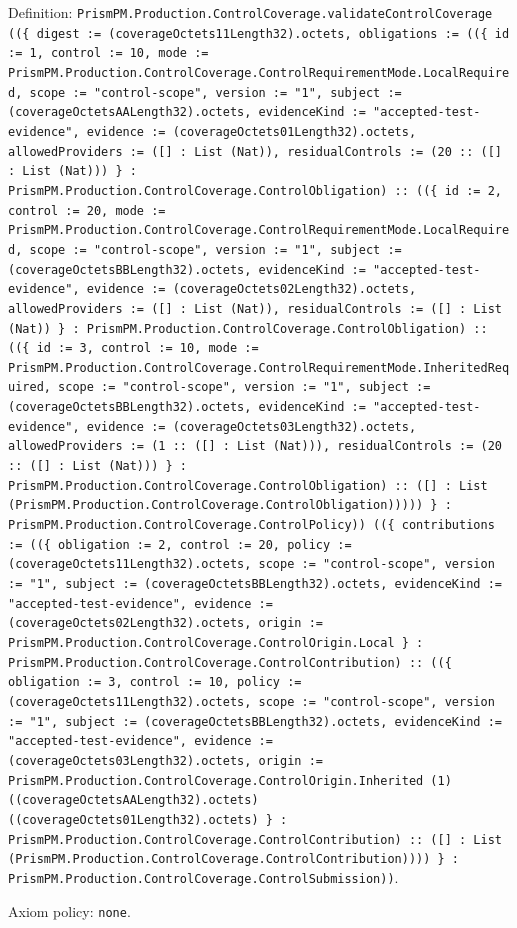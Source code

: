 \documentclass[11pt]{article}
\begin{document}
\noindent Definition: \texttt{PrismPM.Production.ControlCoverage.validateControlCoverage ((\{ digest := (coverageOctets11Length32).octets, obligations := ((\{ id := 1, control := 10, mode := PrismPM.Production.ControlCoverage.ControlRequirementMode.LocalRequired, scope := "control-scope", version := "1", subject := (coverageOctetsAALength32).octets, evidenceKind := "accepted-test-evidence", evidence := (coverageOctets01Length32).octets, allowedProviders := ([] : List (Nat)), residualControls := (20 :: ([] : List (Nat))) \} : PrismPM.Production.ControlCoverage.ControlObligation) :: ((\{ id := 2, control := 20, mode := PrismPM.Production.ControlCoverage.ControlRequirementMode.LocalRequired, scope := "control-scope", version := "1", subject := (coverageOctetsBBLength32).octets, evidenceKind := "accepted-test-evidence", evidence := (coverageOctets02Length32).octets, allowedProviders := ([] : List (Nat)), residualControls := ([] : List (Nat)) \} : PrismPM.Production.ControlCoverage.ControlObligation) :: ((\{ id := 3, control := 10, mode := PrismPM.Production.ControlCoverage.ControlRequirementMode.InheritedRequired, scope := "control-scope", version := "1", subject := (coverageOctetsBBLength32).octets, evidenceKind := "accepted-test-evidence", evidence := (coverageOctets03Length32).octets, allowedProviders := (1 :: ([] : List (Nat))), residualControls := (20 :: ([] : List (Nat))) \} : PrismPM.Production.ControlCoverage.ControlObligation) :: ([] : List (PrismPM.Production.ControlCoverage.ControlObligation))))) \} : PrismPM.Production.ControlCoverage.ControlPolicy)) ((\{ contributions := ((\{ obligation := 2, control := 20, policy := (coverageOctets11Length32).octets, scope := "control-scope", version := "1", subject := (coverageOctetsBBLength32).octets, evidenceKind := "accepted-test-evidence", evidence := (coverageOctets02Length32).octets, origin := PrismPM.Production.ControlCoverage.ControlOrigin.Local \} : PrismPM.Production.ControlCoverage.ControlContribution) :: ((\{ obligation := 3, control := 10, policy := (coverageOctets11Length32).octets, scope := "control-scope", version := "1", subject := (coverageOctetsBBLength32).octets, evidenceKind := "accepted-test-evidence", evidence := (coverageOctets03Length32).octets, origin := PrismPM.Production.ControlCoverage.ControlOrigin.Inherited (1) ((coverageOctetsAALength32).octets) ((coverageOctets01Length32).octets) \} : PrismPM.Production.ControlCoverage.ControlContribution) :: ([] : List (PrismPM.Production.ControlCoverage.ControlContribution)))) \} : PrismPM.Production.ControlCoverage.ControlSubmission))}.\par
\noindent Axiom policy: \texttt{none}.\par
\end{document}
